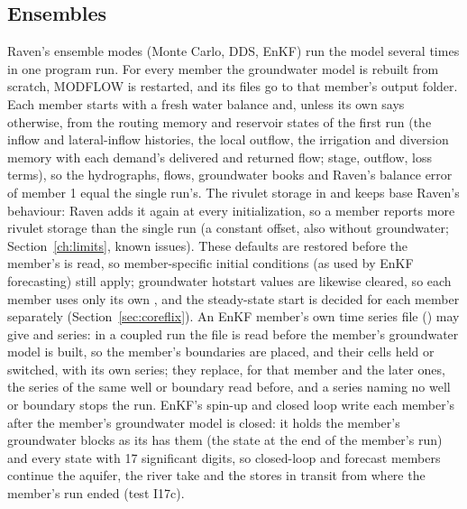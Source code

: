 \subsection{Ensembles}
Raven's ensemble modes (Monte Carlo, DDS, EnKF) run the model several times in one program run. For every member the
groundwater model is rebuilt from scratch, MODFLOW is restarted, and its files go to that member's output folder.
Each member starts with a fresh water balance and, unless its own  says
otherwise, from the routing memory and reservoir states of the first run (the inflow and lateral-inflow histories, the
local outflow, the irrigation and diversion memory with each demand's delivered and returned flow; stage, outflow, loss
terms), so the hydrographs, flows, groundwater books and Raven's balance error of member 1 equal the single run's.
The rivulet storage in  and  keeps base Raven's behaviour: Raven adds it
again at every initialization, so a member reports more rivulet storage than the single run (a constant offset, also
without groundwater; Section~\ref{ch:limits}, known issues). These defaults are
restored before the member's  is read, so member-specific initial conditions (as used by EnKF forecasting) still
apply; groundwater hotstart values are likewise cleared, so each member uses only its own , and the steady-state
start is decided for each member separately
(Section~\ref{sec:coreflix}). An EnKF member's own time series file () may give
 and  series: in a coupled run the file is read before the member's groundwater
model is built, so the member's boundaries are placed, and their cells held or switched, with its own series; they
replace, for that member and the later ones, the series of the same well or boundary read before, and a series naming no
well or boundary stops the run. EnKF's spin-up and closed loop write each member's  after the
member's groundwater model is closed: it holds the member's groundwater blocks as its  has them (the
state at the end of the member's run) and every state with 17 significant digits, so closed-loop and forecast members
continue the aquifer, the river take and the stores in transit from where the member's run ended (test I17c).

